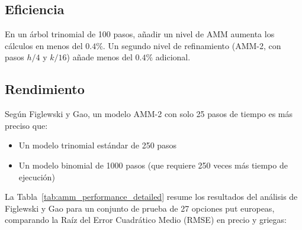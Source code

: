 \subsection{Eficiencia}

En un árbol trinomial de 100 pasos, añadir un nivel de AMM aumenta los cálculos en menos del $0.4\%$. Un segundo nivel de refinamiento (AMM-2, con pasos $h/4$ y $k/16$) añade menos del $0.4\%$ adicional.

\subsection{Rendimiento}

Según Figlewski y Gao, un modelo AMM-2 con solo 25 pasos de tiempo es más preciso que:
\begin{itemize}
    \item Un modelo trinomial estándar de 250 pasos
    \item Un modelo binomial de 1000 pasos (que requiere 250 veces más tiempo de ejecución)
\end{itemize}

La Tabla~\ref{tab:amm_performance_detailed} resume los resultados del análisis de Figlewski y Gao para un conjunto de prueba de 27 opciones put europeas, comparando la Raíz del Error Cuadrático Medio (RMSE) en precio y griegas:

